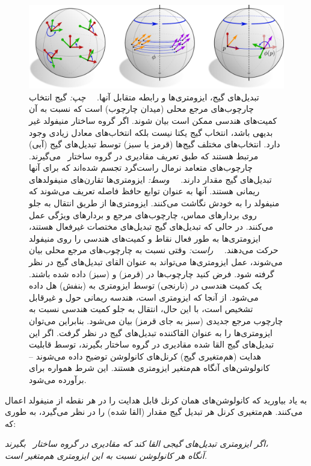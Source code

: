 \begin{figure}
	\centering
	\includegraphics[width=.98\columnwidth]{figures/intro_gauge_isom_equiv.pdf}
	\vspace*{-1ex}
	\caption{\small
		تبدیل‌های گیج، ایزومتری‌ها و رابطه متقابل آنها.
		\ \ \emph{چپ:}
		گیج انتخاب چارچوب‌های مرجع محلی (میدان چارچوب) است که نسبت به آن کمیت‌های هندسی ممکن است بیان شوند.
		اگر گروه ساختار منیفولد  غیر بدیهی باشد، انتخاب گیج یکتا نیست بلکه انتخاب‌های معادل زیادی وجود دارد.
		انتخاب‌های مختلف گیج‌ها (قرمز یا سبز) توسط تبدیل‌های گیج (آبی) مرتبط هستند که طبق تعریف مقادیری در گروه ساختار~ می‌گیرند.
		چارچوب‌های متعامد نرمال راست‌گرد تجسم شده‌اند که برای آنها تبدیل‌های گیج مقدار  دارند.
		\ \ \emph{وسط:}
		ایزومتری‌ها تقارن‌های منیفولدهای ریمانی هستند.
		آنها به عنوان توابع حافظ فاصله  تعریف می‌شوند که منیفولد را به خودش نگاشت می‌کنند.
		ایزومتری‌ها از طریق انتقال به جلو روی بردارهای مماس، چارچوب‌های مرجع و بردارهای ویژگی عمل می‌کنند.
		در حالی که تبدیل‌های گیج تبدیل‌های مختصات غیرفعال هستند، ایزومتری‌ها به طور فعال نقاط و کمیت‌های هندسی را روی منیفولد حرکت می‌دهند.
		\ \ \emph{راست:}
		وقتی نسبت به چارچوب‌های مرجع محلی بیان می‌شوند، عمل ایزومتری‌ها می‌تواند به عنوان القای تبدیل‌های گیج در نظر گرفته شود.
		فرض کنید چارچوب‌ها در  (قرمز) و  (سبز) داده شده باشند.
		یک کمیت هندسی در  (نارنجی) توسط ایزومتری به  (بنفش) هل داده می‌شود.
		از آنجا که \lr{$\phi$} ایزومتری است، هندسه ریمانی حول  و  غیرقابل تشخیص است، با این حال، انتقال به جلو کمیت هندسی نسبت به چارچوب مرجع جدیدی (سبز به جای قرمز) بیان می‌شود.
		بنابراین می‌توان ایزومتری‌ها را به عنوان القاکننده تبدیل‌های گیج در نظر گرفت.
		اگر این تبدیل‌های گیج القا شده مقادیری در گروه ساختار  بگیرند، توسط قابلیت هدایت  (هم‌متغیری گیج) کرنل‌های کانولوشن توضیح داده می‌شوند -- کانولوشن‌های \lr{$\GM$} آنگاه هم‌متغیر ایزومتری هستند.
		این شرط همواره برای  برآورده می‌شود.
	}
	\label{fig:intro_gauge_isom_induction}
\end{figure}


به یاد بیاورید که کانولوشن‌های \lr{$\GM$} همان کرنل قابل هدایت  را در هر نقطه از منیفولد اعمال می‌کنند.
هم‌متغیری  کرنل هر تبدیل گیج مقدار  (القا شده) را در نظر می‌گیرد، به طوری که:
\begin{center}\it
	اگر ایزومتری تبدیل‌های گیجی القا کند که مقادیری در گروه ساختار~ بگیرند، \\
	آنگاه هر کانولوشن \lr{$\GM$} نسبت به این ایزومتری هم‌متغیر است.
\end{center}


